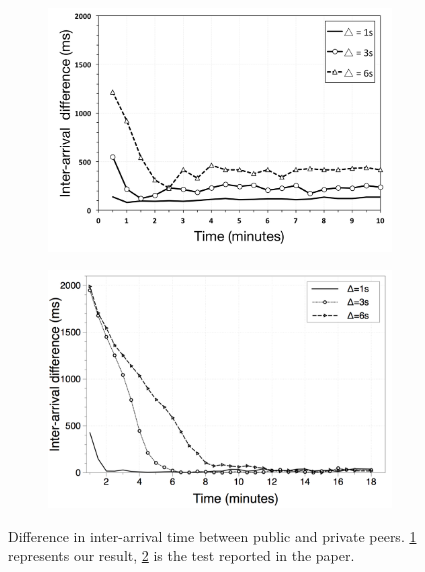 
\begin{figure}
\centering
\begin{subfigure}{.5\textwidth}
  \centering
  \includegraphics[keepaspectratio=true, width=1\linewidth]{images/interarrivaltime_difference}
  \caption{}
  \label{fig:interarrivaltime_difference}
\end{subfigure}%
\begin{subfigure}{.5\textwidth}
  \centering
  \includegraphics[keepaspectratio=true, width=1\linewidth]{images/paper_interarrivaltime_difference}
  \caption{}
  \label{fig:paper_interarrivaltime_difference}
\end{subfigure}
\caption{Difference in inter-arrival time between public and private peers. \ref{fig:interarrivaltime_difference} represents our result, \ref{fig:paper_interarrivaltime_difference} is the test reported in the paper.}
\label{fig:ad_interarrivaltime_difference}
\end{figure}


